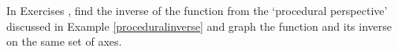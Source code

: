{\noindent In Exercises}
{, find the inverse of the function from the `procedural perspective' discussed in Example \ref{proceduralinverse} and graph the function and its inverse on the same set of axes.}
